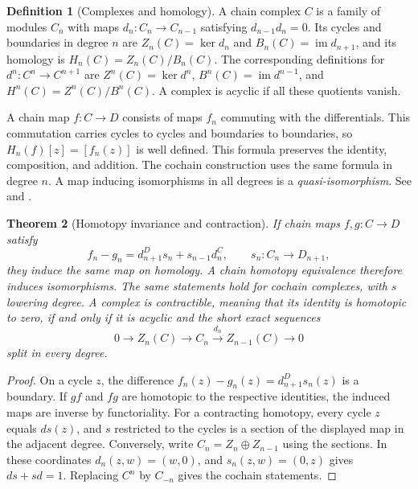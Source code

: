\documentclass[11pt,oneside,openany]{book}
\newtheorem{theorem}{Theorem}[chapter]
\theoremstyle{definition}
\newtheorem{definition}[theorem]{Definition}
\theoremstyle{remark}
\begin{document}
\begin{definition}[Complexes and homology]
\label{p103:ALG-10-C01-R01}
A chain complex \(C\) is a family of modules \(C_n\) with maps
\(d_n:C_n\to C_{n-1}\) satisfying \(d_{n-1}d_n=0\). Its cycles and
boundaries in degree \(n\) are \(Z_n(C)=\ker d_n\) and
\(B_n(C)=\operatorname{im}d_{n+1}\), and its homology is
\(H_n(C)=Z_n(C)/B_n(C)\). The corresponding definitions for
\(d^n:C^n\to C^{n+1}\) are \(Z^n(C)=\ker d^n\),
\(B^n(C)=\operatorname{im}d^{n-1}\), and \(H^n(C)=Z^n(C)/B^n(C)\).
A complex is acyclic if all these quotients vanish.
\end{definition}

A chain map \(f:C\to D\) consists of maps \(f_n\) commuting with the
differentials. This commutation carries cycles to cycles and
boundaries to boundaries, so \(H_n(f)[z]=[f_n(z)]\) is well defined.
This formula preserves the identity, composition, and addition.
The cochain construction uses the same formula in degree \(n\).
A map inducing isomorphisms in all degrees is a
\emph{quasi-isomorphism}. See \cite[\S1.1]{weibel} and
\cite[\S6.1]{rotman}.

\begin{theorem}[Homotopy invariance and contraction]
\label{p103:ALG-10-C01-R02}
If chain maps \(f,g:C\to D\) satisfy
\[
 f_n-g_n=d_{n+1}^D s_n+s_{n-1}d_n^C,\qquad s_n:C_n\to D_{n+1},
\]
they induce the same map on homology. A chain homotopy equivalence
therefore induces isomorphisms. The same statements hold for
cochain complexes, with \(s\) lowering degree. A complex is
contractible, meaning that its identity is homotopic to zero, if and
only if it is acyclic and the short exact sequences
\[
 0\longrightarrow Z_n(C)\longrightarrow C_n
 \xrightarrow{d_n} Z_{n-1}(C)\longrightarrow 0
\]
split in every degree.
\end{theorem}

\begin{proof}
On a cycle \(z\), the difference \(f_n(z)-g_n(z)=d_{n+1}^D s_n(z)\)
is a boundary. If \(gf\) and \(fg\) are homotopic to the respective
identities, the induced maps are inverse by functoriality.
For a contracting homotopy, every cycle \(z\) equals \(d s(z)\), and
\(s\) restricted to the cycles is a section of the displayed map
in the adjacent degree. Conversely, write \(C_n=Z_n\oplus Z_{n-1}\)
using the sections. In these coordinates \(d_n(z,w)=(w,0)\), and
\(s_n(z,w)=(0,z)\) gives \(d s+s d=1\).
Replacing \(C^n\) by \(C_{-n}\) gives the cochain statements.
\end{proof}
\end{document}
